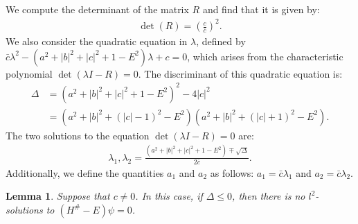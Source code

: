 \documentclass{amsart}
\newtheorem{lem}[thm]{Lemma}
\theoremstyle{definition}
\theoremstyle{remark}
\begin{document}
We compute the determinant of the matrix \(R\) and find that it is given by:
\begin{align*}
\det(R) = \left( \frac{c}{\bar{c}} \right)^2.
\end{align*}
We also consider the quadratic equation in \(\lambda\), defined by \(\bar{c} \lambda^2 - (a^2 + |b|^2 + |c|^2 + 1 - E^2) \lambda + c = 0\), which arises from the characteristic polynomial \(\det(\lambda I - R) = 0\). The discriminant of this quadratic equation is:
\begin{align*}
\Delta &= (a^2 + |b|^2 + |c|^2 + 1 - E^2)^2 - 4|c|^2 \\
&= (a^2 + |b|^2 + (|c| - 1)^2 - E^2)(a^2 + |b|^2 + (|c| + 1)^2 - E^2).
\end{align*}
The two solutions to the equation \(\det(\lambda I - R) = 0\) are:
\begin{align*}
\lambda_1, \lambda_2 = \frac{(a^2 + |b|^2 + |c|^2 + 1 - E^2) \mp \sqrt{\Delta}}{2 \bar{c}}.
\end{align*}
Additionally, we define the quantities \(a_1\) and \(a_2\) as follows: \(a_1 = \bar{c} \lambda_1\) and \(a_2 = \bar{c} \lambda_2\).

\begin{lem}\label{lem:6.4}
Suppose that $c\neq 0$. In this case, if $\Delta \leq 0$, then there is no $l^2$-solutions to $(H^{\#}-E)\psi=0$.
\end{lem}
\end{document}
